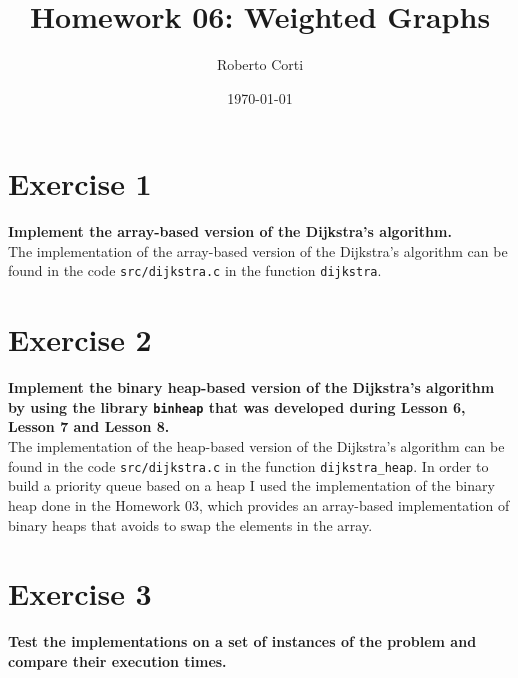 \documentclass{article}
\title{Homework 06: Weighted Graphs}
\date{\today}
\author{Roberto Corti}
\begin{document}
	
	\maketitle
	
	\section*{Exercise 1}
	\textbf{Implement the array-based version of the Dijkstra’s algorithm.}\\
	
	\noindent The implementation of the array-based version of the Dijkstra’s algorithm can be found in the code \texttt{src/dijkstra.c} in the function \texttt{dijkstra}. 
	
	
	\section*{Exercise 2}
	\textbf{Implement the binary heap-based version of the Dijkstra’s algorithm by using the library \texttt{binheap} that was developed during Lesson 6, Lesson 7 and Lesson 8.}\\
	
	\noindent The implementation of the heap-based version of the Dijkstra’s algorithm can be found in the code \texttt{src/dijkstra.c} in the function \texttt{dijkstra\_heap}. In order to build a priority queue based on a heap I used the implementation of the binary heap done in the Homework 03, which provides an array-based implementation of binary heaps that avoids to swap the elements in the array.
	
	\section*{Exercise 3}
	\textbf{Test the implementations on a set of instances of the problem and compare their execution times.}\\ 
	
\end{document}

